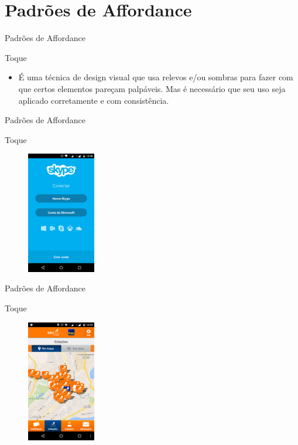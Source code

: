 \section{Padrões de Affordance}

\begin{frame}{Padrões de Affordance}
\begin{block}{Toque}
  \begin{itemize}
    \item<1-> É uma técnica de design visual que usa relevos e/ou sombras para fazer com que certos elementos pareçam palpáveis. Mas é necessário que seu uso seja aplicado corretamente e com consistência.
  \end{itemize}
\end{block}
\end{frame}

\begin{frame}{Padrões de Affordance}
\begin{block}{Toque}
    \begin{figure}
    \includegraphics[width=3cm]{figuras/touch/tocar}
    \end{figure}
\end{block}
\end{frame}

\begin{frame}{Padrões de Affordance}
\begin{block}{Toque}
    \begin{figure}
    \includegraphics[width=3cm]{figuras/touch/tocar3}
    \end{figure}
\end{block}
\end{frame}


